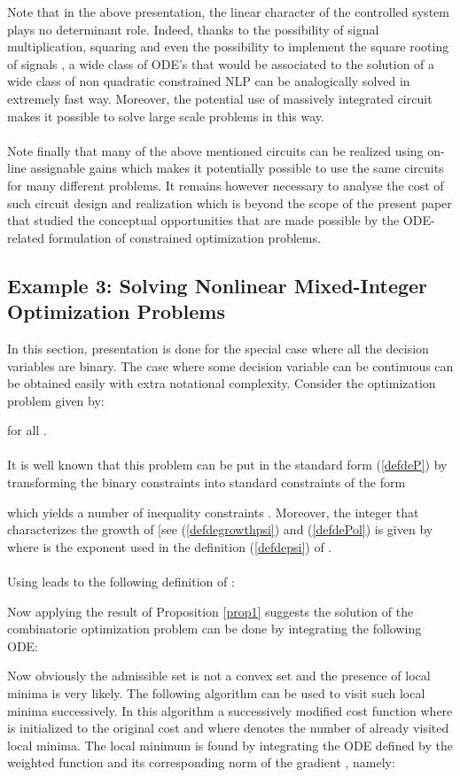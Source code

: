 \documentclass{article}
\begin{document}
Note that in the above presentation, the linear character of the controlled system plays no determinant role. Indeed, thanks to the possibility of signal multiplication, squaring and even the possibility to implement the square rooting of signals \cite{Filanovski:1992}, a wide class of ODE's that would be associated to the solution of a wide class of non quadratic constrained NLP can be analogically solved in extremely fast way. Moreover, the potential use of massively integrated circuit makes it possible to solve large scale problems in this way.\ \\ \ \\ 
Note finally that many of the above mentioned circuits can be realized using on-line assignable gains which makes it potentially possible to use the same circuits for many different problems. It remains however necessary to analyse the cost of such circuit design and realization which is beyond the scope of the present paper that studied the conceptual opportunities that are made possible by the ODE-related formulation of constrained optimization problems. 
\subsection{Example 3: Solving Nonlinear Mixed-Integer Optimization Problems}
\noindent In this section, presentation is done for the special case where all the decision variables are binary. The case where some decision variable can be continuous can be obtained easily with extra notational complexity. Consider the optimization problem given by:
 
for all . \ \\ \ \\ 
It is well known that this problem can be put in the standard form (\ref{defdeP}) by transforming the binary  constraints  into standard constraints of the form
  
which yields a number of inequality constraints . Moreover, the integer  that characterizes the growth of  [see (\ref{defdegrowthpsi}) and (\ref{defdePol}) is given by  where  is the exponent used in the definition (\ref{defdepsi}) of .\ \\ \ \\ 
Using  leads to the following definition of :
  
Now applying the result of Proposition \ref{prop1} suggests the solution of the combinatoric optimization problem can be done by integrating the following ODE:
  
Now obviously the admissible set is not a convex set and the presence of local minima is very likely. The following algorithm can be used to visit such local minima successively. In this algorithm a successively modified cost function  where  is initialized to the original cost and where  denotes the number of already visited local minima. The local minimum  is found by integrating the ODE defined by the weighted function  and its corresponding norm of the gradient , namely:
  
\end{document}
